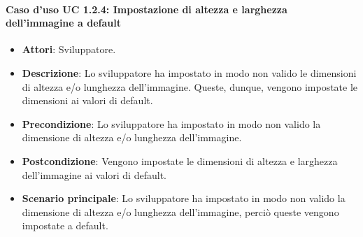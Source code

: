 \paragraph{Caso d'uso UC 1.2.4: Impostazione di altezza e larghezza dell'immagine a default}

\FloatBarrier
\begin{itemize}
\item\textbf{Attori}: Sviluppatore.
\item\textbf{Descrizione}: Lo sviluppatore ha impostato in modo non valido le dimensioni di altezza e/o lunghezza dell'immagine. Queste, dunque, vengono impostate le dimensioni ai valori di default.
\item\textbf{Precondizione}: Lo sviluppatore ha impostato in modo non valido la dimensione di altezza e/o lunghezza dell'immagine.
\item\textbf{Postcondizione}: Vengono impostate le dimensioni di altezza e larghezza dell'immagine ai valori di default.
\item\textbf{Scenario principale}: Lo sviluppatore ha impostato in modo non valido la dimensione di altezza e/o lunghezza dell'immagine, perciò queste vengono impostate a default.
\end{itemize}


